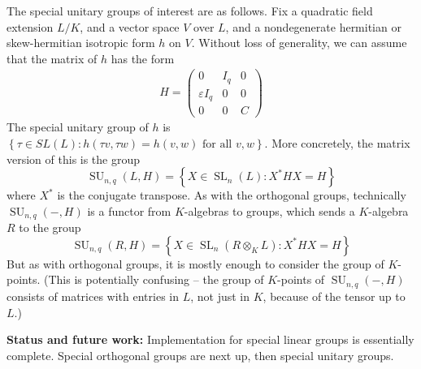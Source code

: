\documentclass[12pt]{article}
\newcommand{\eps}{\varepsilon}
\newcommand{\lb}{\left\{}
\newcommand{\rb}{\right\}}
\newcommand{\tbf}{\textbf}
\DeclareMathOperator{\SL}{SL}
\DeclareMathOperator{\SU}{SU}
\begin{document}
\begin{mdframed}[linecolor=red]
The special unitary groups of interest are as follows. Fix a quadratic field extension $L/K$, and a vector space $V$ over $L$, and a nondegenerate hermitian or skew-hermitian isotropic form $h$ on $V$. Without loss of generality, we can assume that the matrix of $h$ has the form
\begin{align*}
	H = \begin{pmatrix}
		0 & I_q & 0 \\
		\eps I_q & 0 & 0 \\
		0 & 0 & C
	\end{pmatrix}
\end{align*}
The special unitary group of $h$ is $\lb \tau \in SL(L) : h(\tau v, \tau w) = h(v,w) \text{ for all } v,w \rb$. More concretely, the matrix version of this is the group
\[
	\SU_{n,q}(L,H) = \lb X \in \SL_n(L) : X^* H X = H \rb
\]
where $X^*$ is the conjugate transpose. As with the orthogonal groups, technically $\SU_{n,q}(-,H)$ is a functor from $K$-algebras to groups, which sends a $K$-algebra $R$ to the group
\[
	\SU_{n,q}(R,H) = \lb X \in \SL_n(R \otimes_K L) : X^* H X = H \rb
\]
But as with orthogonal groups, it is mostly enough to consider the group of $K$-points. (This is potentially confusing -- the group of $K$-points of $\SU_{n,q}(-,H)$ consists of matrices with entries in $L$, not just in $K$, because of the tensor up to $L$.)

\smallskip

\tbf{Status and future work:} Implementation for special linear groups is essentially complete. Special orthogonal groups are next up, then special unitary groups.
\end{mdframed}
\end{document}

